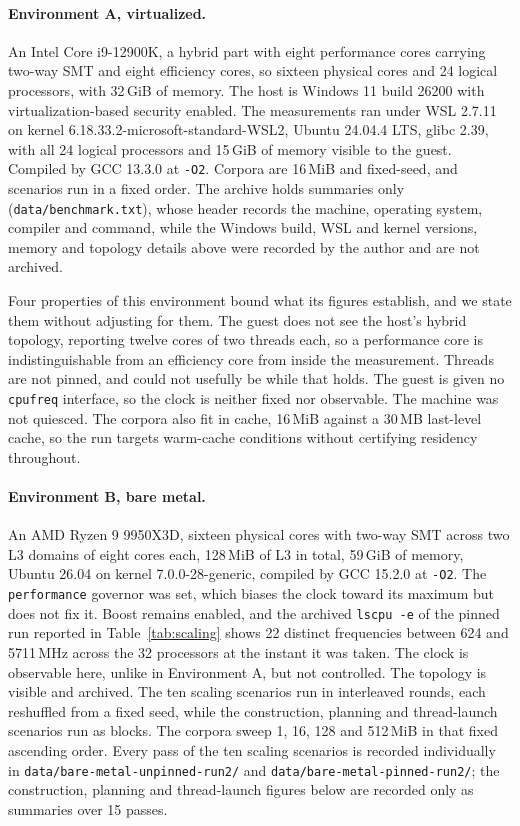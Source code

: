 \documentclass[11pt,a4paper]{article}
\theoremstyle{definition}
\theoremstyle{plain}
\newcommand{\code}[1]{\texttt{#1}}
\begin{document}
\paragraph{Environment A, virtualized.} An Intel Core i9-12900K, a hybrid part with eight performance cores carrying
two-way SMT and eight efficiency cores, so sixteen physical cores and 24 logical processors, with 32\,GiB of memory. The
host is Windows 11 build 26200 with virtualization-based security enabled. The measurements ran under WSL 2.7.11 on
kernel 6.18.33.2-microsoft-standard-WSL2, Ubuntu 24.04.4 LTS, glibc 2.39, with all 24 logical processors and 15\,GiB of
memory visible to the guest. Compiled by GCC 13.3.0 at \code{-O2}. Corpora are 16\,MiB and fixed-seed, and scenarios run
in a fixed order. The archive holds summaries only (\code{data/benchmark.txt}), whose header records the machine,
operating system, compiler and command, while the Windows build, WSL and kernel versions, memory and topology details
above were recorded by the author and are not archived.

Four properties of this environment bound what its figures establish, and we state them without adjusting for them. The
guest does not see the host's hybrid topology, reporting twelve cores of two threads each, so a performance core is
indistinguishable from an efficiency core from inside the measurement. Threads are not pinned, and could not usefully be
while that holds. The guest is given no \code{cpufreq} interface, so the clock is neither fixed nor observable. The
machine was not quiesced. The corpora also fit in cache, 16\,MiB against a 30\,MB last-level cache, so the run targets
warm-cache conditions without certifying residency throughout.

\paragraph{Environment B, bare metal.} An AMD Ryzen 9 9950X3D, sixteen physical cores with two-way SMT across two L3
domains of eight cores each, 128\,MiB of L3 in total, 59\,GiB of memory, Ubuntu 26.04 on kernel 7.0.0-28-generic,
compiled by GCC 15.2.0 at \code{-O2}. The \code{performance} governor was set, which biases the clock toward its maximum
but does not fix it. Boost remains enabled, and the archived \code{lscpu -e} of the pinned run reported in
Table~\ref{tab:scaling} shows 22 distinct frequencies between 624 and 5711\,MHz across the 32 processors at the instant
it was taken. The clock is observable here, unlike in Environment A, but not controlled. The topology is visible and
archived. The ten scaling scenarios run in interleaved rounds, each reshuffled from a fixed seed, while the
construction, planning and thread-launch scenarios run as blocks. The corpora sweep 1, 16, 128 and 512\,MiB in that
fixed ascending order. Every pass of the ten scaling scenarios is recorded individually in
\code{data/bare-metal-unpinned-run2/} and \code{data/bare-metal-pinned-run2/}; the construction, planning and
thread-launch figures below are recorded only as summaries over 15 passes.
\end{document}
